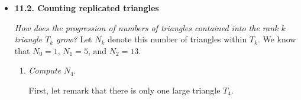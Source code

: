 \begin{itemize}
\item
{\bf 11.2. Counting replicated triangles}
\smallskip

{\em How does the progression of numbers of triangles contained into the rank $k$ triangle $T_k$ grow?}
Let $N_k$ denote this number of triangles within $T_k$.  
We know that $N_0 =1$, $N_1 = 5$, and $N_2 = 13$.
  \begin{enumerate}
  \item
{\em Compute} $N_4$.
\smallskip

First, let remark that there is only one large triangle $T_4$.


\end{enumerate}
\end{itemize}
